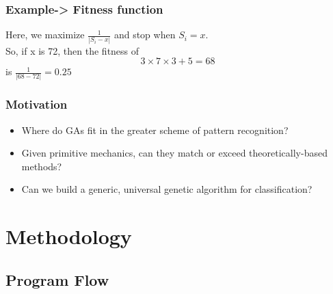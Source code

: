 \documentclass{beamer}
\begin{document}
\begin{frame}
	\frametitle{Example-> Fitness function}
	Here, we maximize $\frac{1}{|S_i-x|}$ and stop when $S_i = x$.\\
	So, if x is 72, then the fitness of $$3 \times 7 \times 3 + 5 = 68$$
	is $\frac{1}{|68-72|} = 0.25$
\end{frame}

\begin{frame} \frametitle{Motivation}
\begin{itemize}
	\item Where do GAs fit in the greater scheme of pattern recognition?
	\item Given primitive mechanics, can they match or exceed theoretically-based methods?
	\item Can we build a generic, universal genetic algorithm for classification?
\end{itemize}

\end{frame}
\section{Methodology}

\begin{frame}

\end{frame}

\subsection{Program Flow}
\end{document}
